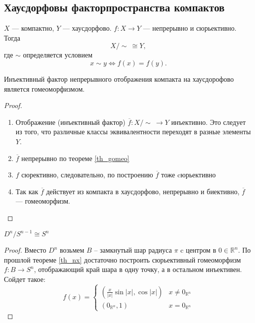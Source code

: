 \documentclass[11pt]{book}
\newcommand{\R}{\mathbb{R}}
\theoremstyle{definition}
\theoremstyle{plain}
\theoremstyle{plain}
\theoremstyle{definition}
\theoremstyle{remark}
\begin{document}
\subsection{Хаусдорфовы факторпространства компактов}
\begin{thm}\label{th_nx}
    $ X$ --- компактно, $ Y$ --- хаусдорфово.
    $ f : X \to  Y $ --- непрерывно и сюрьективно.
    Тогда 
    \[ 
	X /\!\! \sim  \: \cong  Y
    ,\]
    где $ \sim $ определяется условием \[
	x \sim y \Longleftrightarrow f(x) = f(y)
    .\]
\end{thm}
\begin{thm}[Переформулировка]
    Инъективный фактор непрерывного отображения компакта на хаусдорофово является гомеоморфизмом.
\end{thm}
\begin{proof}
    $ $
    \begin{enumerate}
	\item Отображение (инъективный фактор) $ \overline{f}: X / \! \sim \: \to  Y$ инъективно. 
	    Это следует из того, что различные классы эквивалентности переходят в разные элементы $ Y$.
	\item  $ \overline{f}$ непрерывно по теореме \ref{th_gomeo}
	\item $ f$ сюрективно, следовательно, по построению  $ \overline{f}$ тоже cюрьективно
	\item  Так как $ \overline{f}$ действует из компакта в хаусдорфово, непрерывно и биективно, $ \overline{f}$ --- гомеоморфизм.
    \end{enumerate}
\end{proof}
\begin{thm}\label{proof_dn_sn}
    $ D^{n} / S^{n-1} \cong S^{n}$
\end{thm}
\begin{proof}
    Вместо $ D^{n}$ возьмем $ B$ -- замкнутый шар радиуса $ \pi$ c  центром в $ 0 \in \R^{n} $.
    По прошлой теореме \ref{th_nx} достаточно построить сюрьективный гомеоморфизм $ f: B \to  S ^{n}$, отображающий край шара в одну точку, а в остальном инъективен.
    Сойдет такое:
    \[
	f(x) =
	\begin{cases}
	    \left( \frac{x}{|x|} \sin|x|, \cos |x| \right) & x \ne  0_{\R^{n}} \\
	    (0_{\R^{n}}, 1) & x = 0_{\R^{n}}
	\end{cases}
    \]
\end{proof}
\end{document}
